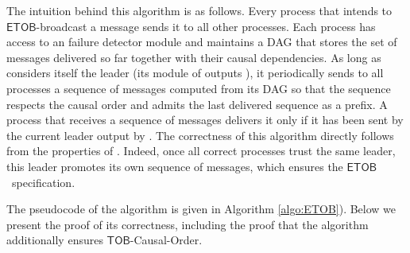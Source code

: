 \documentclass[11pt]{article}
\newcommand{\ETOB}{\ensuremath{\mathsf{ETOB}}}
\newcommand{\TOB}{\ensuremath{\mathsf{TOB}}}
\begin{document}
The intuition behind this algorithm is as follows. Every process that intends to \ETOB-broadcast
a message sends it to all other processes.
Each process  has access to an  failure
detector module and maintains a DAG that stores the set of messages
delivered so far together with their causal dependencies.
As long as  considers itself the leader (its module of 
outputs ), it periodically sends to all processes a sequence of
messages computed from its DAG so that the sequence respects the causal order and admits the last delivered sequence as a prefix.
A process that receives a sequence of messages delivers it only if it has 
been sent by the current leader output by .
The correctness of this algorithm directly follows from the properties
of . Indeed, once all correct processes trust the same leader,
this leader promotes its own sequence of messages, which 
ensures the \ETOB~specification. 

The pseudocode of the algorithm  is given in Algorithm
\ref{algo:ETOB}).
Below we present the proof of its correctness,  including the proof that the algorithm
additionally ensures \TOB-Causal-Order.
\end{document}
